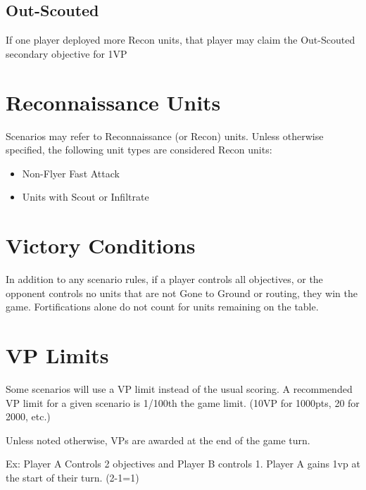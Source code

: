\documentclass[letterpaper,twocolumn,oneside,titlepage]{book}
\providecommand{\tightlist}{%
  \setlength{\itemsep}{0pt}\setlength{\parskip}{0pt}}
\begin{document}
\subsection{\texorpdfstring{\textbf{Out-Scouted}}{Out-Scouted}}\label{out-scouted}

If one player deployed more Recon units, that player may claim the
Out-Scouted secondary objective for 1VP

\section{\texorpdfstring{\textbf{Reconnaissance
Units}}{Reconnaissance Units}}\label{reconnaissance-units}

Scenarios may refer to Reconnaissance (or Recon) units. Unless otherwise
specified, the following unit types are considered Recon units:

\begin{itemize}
\tightlist
\item
  Non-Flyer Fast Attack\\
\item
  Units with Scout or Infiltrate
\end{itemize}

\section{\texorpdfstring{\textbf{Victory
Conditions}}{Victory Conditions}}\label{victory-conditions}

In addition to any scenario rules, if a player controls all objectives,
or the opponent controls no units that are not Gone to Ground or
routing, they win the game. Fortifications alone do not count for units
remaining on the table.

\section{\texorpdfstring{\textbf{VP
Limits}}{VP Limits}}\label{vp-limits}

Some scenarios will use a VP limit instead of the usual scoring. A
recommended VP limit for a given scenario is 1/100th the game limit.
(10VP for 1000pts, 20 for 2000, etc.)

Unless noted otherwise, VPs are awarded at the end of the game turn.

Ex: Player A Controls 2 objectives and Player B controls 1. Player A gains 1vp at the start of their turn. (2-1=1)
\end{document}
